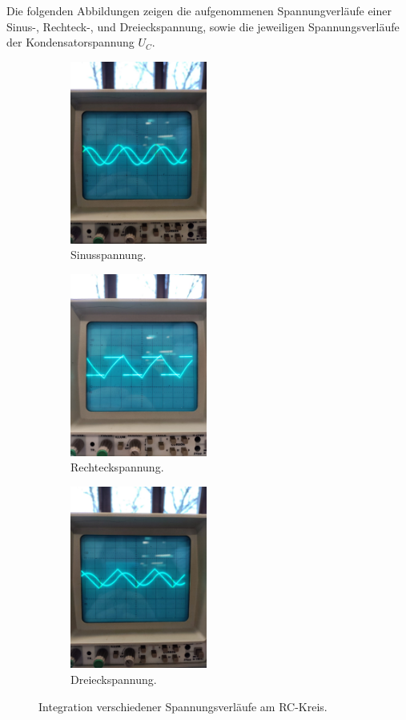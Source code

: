 Die folgenden Abbildungen zeigen die aufgenommenen Spannungverläufe einer Sinus-, Rechteck-, und Dreieckspannung, sowie die jeweiligen Spannungsverläufe der Kondensatorspannung $U_C$.
\begin{figure}[H]
	\centering
	\begin{subfigure}[b]{0.3\textwidth}
		\centering
		\includegraphics[width=4.5cm]{build/sinus.jpeg}
		\caption{Sinusspannung.}
	\end{subfigure}
	\begin{subfigure}[b]{0.3\textwidth}
		\centering
		\includegraphics[width=4.5cm]{build/Rechteck.jpeg}
		\caption{Rechteckspannung.}
	\end{subfigure}
	\begin{subfigure}[b]{0.3\textwidth}
		\centering
		\includegraphics[width=4.5cm]{build/Dreieck.jpeg}
		\caption{Dreieckspannung.}
	\end{subfigure}
  \caption{Integration verschiedener Spannungsverläufe am RC-Kreis.}
  \label{fig:Integration}
\end{figure}





